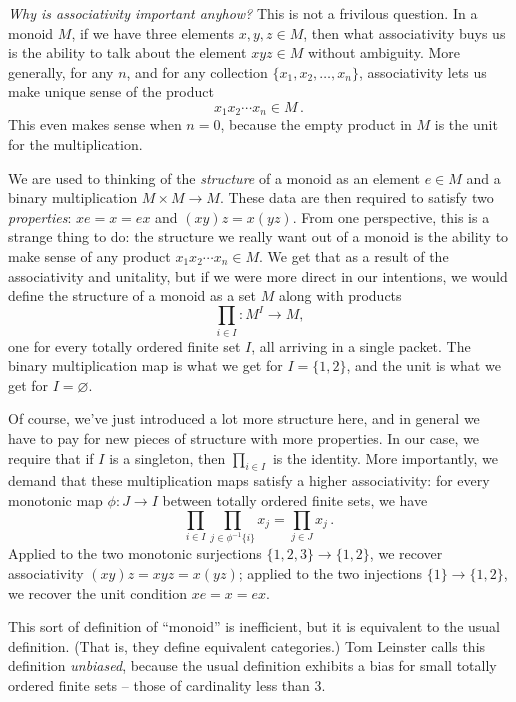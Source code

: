 \emph{Why is associativity important anyhow?}
This is not a frivilous question.
In a monoid $M$, if we have three elements $x,y,z \in M$, then what associativity buys us is the ability to talk about the element $xyz \in M$ without ambiguity.
More generally, for any $n$, and for any collection $\{x_1,x_2,\dots,x_n\}$, associativity lets us make unique sense of the product
\[
  x_1 x_2 \cdots x_n \in M \period
\]
This even makes sense when $n = 0$, because the empty product in $M$ is the unit for the multiplication.

We are used to thinking of the \emph{structure} of a monoid as an element $e \in M$ and a binary multiplication $M \times M \to M$.
These data are then required to satisfy two \emph{properties}: $xe=x=ex$ and $(xy)z=x(yz)$.
From one perspective, this is a strange thing to do:
the structure we really want out of a monoid is the ability to make sense of any product $x_1 x_2 \cdots x_n \in M$.
We get that as a result of the associativity and unitality, but
if we were more direct in our intentions, we would define the structure of a monoid as a set $M$ along with products
\[
  \prod_{i \in I} \colon M^I \to M \comma
\]
one for every totally ordered finite set $I$, all arriving in a single packet.
The binary multiplication map is what we get for $I = \{1,2\}$, and the unit is what we get for $I = \varnothing$.

Of course, we've just introduced a lot more structure here, and
in general we have to pay for new pieces of structure with more properties.
In our case, we require that if $I$ is a singleton, then $\prod_{i \in I}$ is the identity.
More importantly, we demand that these multiplication maps satisfy a higher associativity:
for every monotonic map $\phi \colon J \to I$ between totally ordered finite sets, we have
\[
  \prod_{i \in I} \prod_{j \in \phi^{-1}\{i\}} x_j = \prod_{j \in J} x_j \period
\]
Applied to the two monotonic surjections $\{1,2,3\} \to \{1,2\}$, we recover associativity $(xy)z = xyz = x(yz)$;
applied to the two injections $\{1\} \to \{1,2\}$, we recover the unit condition $xe=x=ex$.

This sort of definition of \enquote{monoid} is inefficient, but
it is equivalent to the usual definition.
(That is, they define equivalent categories.)
Tom Leinster calls this definition \emph{unbiased}, because
the usual definition exhibits a bias for small totally ordered finite sets -- those of cardinality less than $3$.

